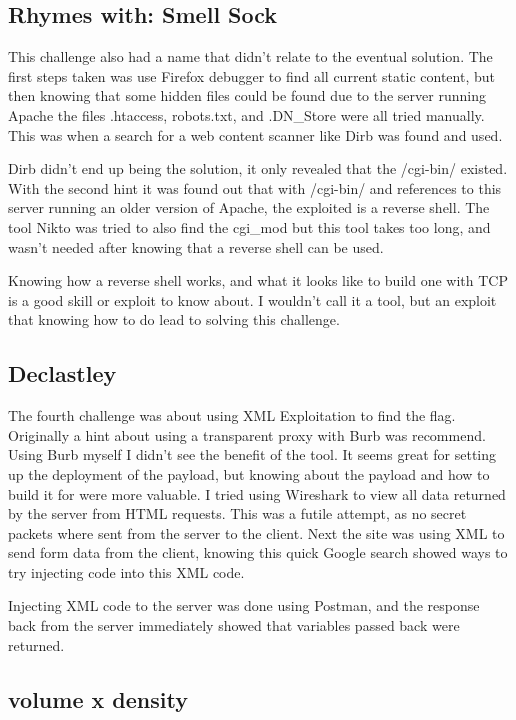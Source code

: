 \documentclass{article}
\begin{document}
\subsection{Rhymes with: Smell Sock}

This challenge also had a name that didn't relate to the eventual solution.  The first steps taken was use Firefox debugger to find all current static content, but then knowing that some hidden files could be found due to the server running Apache the files .htaccess, robots.txt, and .DN\_Store were all tried manually.  This was when a search for a web content scanner like Dirb was found and used.

Dirb didn't end up being the solution, it only revealed that the /cgi-bin/ existed.  With the second hint it was found out that with /cgi-bin/ and references to this server running an older version of Apache, the exploited is a reverse shell.  The tool Nikto was tried to also find the cgi\_mod but this tool takes too long, and wasn't needed after knowing that a reverse shell can be used.

Knowing how a reverse shell works, and what it looks like to build one with TCP is a good skill or exploit to know about.  I wouldn't call it a tool, but an exploit that knowing how to do lead to solving this challenge.

\subsection{Declastley}

The fourth challenge was about using XML Exploitation to find the flag.  Originally a hint about using a transparent proxy with Burb was recommend.  Using Burb myself I didn't see the benefit of the tool.  It seems great for setting up the deployment of the payload, but knowing about the payload and how to build it for were more valuable.  I tried using Wireshark to view all data returned by the server from HTML requests.  This was a futile attempt, as no secret packets where sent from the server to the client.   Next the site was using XML to send form data from the client, knowing this quick Google search showed ways to try injecting code into this XML code.

Injecting XML code to the server was done using Postman, and the response back from the server immediately showed that variables passed back were returned.

\subsection{volume x density}
\end{document}
